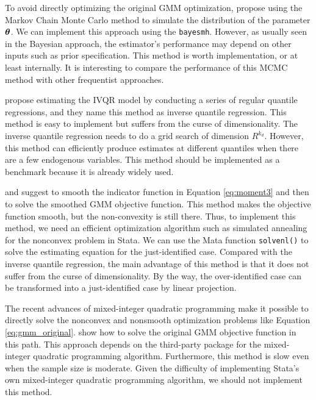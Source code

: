 To avoid directly optimizing the original GMM optimization,
\cite{Chernozhukov2003} propose using the Markov Chain Monte Carlo method to
simulate the distribution of the parameter $\boldsymbol{\theta}$. We can implement this
approach using the {\tt bayesmh}. However, as usually seen in the Bayesian
approach, the estimator's performance may depend on other inputs such as prior
specification.  This method is worth implementation, or at least internally.  It
is interesting to compare the performance of this MCMC method with other
frequentist approaches.

\cite{Chernozhukov2006} propose estimating the IVQR model by conducting a
series of regular quantile regressions, and they name this method as inverse
quantile regression. This method is easy to implement but suffers from the curse
of dimensionality. The inverse quantile regression needs to do a grid search of
dimension $R^{k_d}$. However, this method can efficiently produce estimates at
different quantiles when there are a few endogenous variables. This method should
be implemented as a benchmark because it is already widely used.

\cite{Kaplan2017} and \cite{DeCastro2019} suggest to smooth the indicator
function in Equation \ref{eq:moment3} and then to solve the smoothed GMM
objective function. This method makes the objective function smooth, but the
non-convexity is still there. Thus, to implement this method, we need an
efficient optimization algorithm such as simulated annealing for the nonconvex
problem in Stata. We can use the Mata function {\tt solvenl()} to solve the
estimating equation for the just-identified case.  Compared with the inverse
quantile regression, the main advantage of this method  is that it does not
suffer from the curse of dimensionality. By the way, the over-identified case
can be transformed into a just-identified case by linear projection.

The recent advances of mixed-integer quadratic programming make it possible to
directly solve the nonconvex and nonsmooth optimization problems like Equation
\ref{eq:gmm_original}. \cite{Chen2018} show how to solve the original
GMM objective function in this path. This approach depends on the third-party
package for the mixed-integer quadratic programming algorithm.  Furthermore, 
this method is slow even when the sample size is moderate. 
Given the difficulty of implementing Stata's own mixed-integer quadratic
programming algorithm, we should not implement this method.

